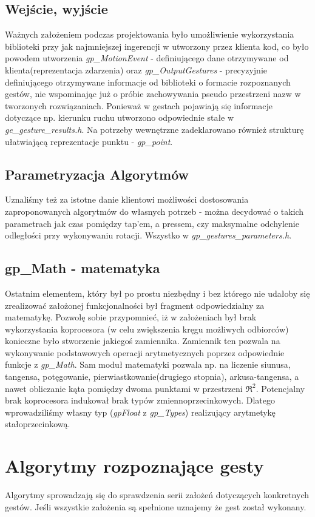 \documentclass[a4paper,12pt]{article}
\begin{document}
\subsection{Wejście, wyjście} Ważnych założeniem podczas projektowania było umożliwienie wykorzystania biblioteki przy jak najmniejszej ingerencji w utworzony przez klienta kod, co było powodem utworzenia \textit{gp_MotionEvent} - definiującego dane otrzymywane od klienta(reprezentacja zdarzenia) oraz \textit{gp_OutputGestures} - precyzyjnie definiującego otrzymywane informacje od biblioteki o formacie rozpoznanych gestów, nie wspominając już o próbie zachowywania pseudo przestrzeni nazw w tworzonych rozwiązaniach. Ponieważ w gestach pojawiają się informacje dotyczące np. kierunku ruchu utworzono odpowiednie stałe w \textit{ge_gesture_results.h}. Na potrzeby wewnętrzne zadeklarowano również strukturę ułatwiającą reprezentacje punktu - \textit{gp_point}. 

\subsection{Parametryzacja Algorytmów} Uznaliśmy też za istotne danie klientowi możliwości dostosowania zaproponowanych algorytmów do własnych potrzeb - można decydować o takich parametrach jak czas pomiędzy tap'em, a pressem, czy maksymalne odchylenie odległości przy wykonywaniu rotacji. Wszystko w \textit{gp_gestures_parameters.h}. 

\subsection{gp_Math - matematyka}Ostatnim elementem, który był po prostu niezbędny i bez którego nie udałoby się zrealizować założonej funkcjonalności był fragment odpowiedzialny za matematykę. Pozwolę sobie przypomnieć, iż w założeniach był brak wykorzystania koprocesora (w celu zwiększenia kręgu możliwych odbiorców) konieczne było stworzenie jakiegoś zamiennika. Zamiennik ten pozwala na wykonywanie podstawowych operacji arytmetycznych poprzez odpowiednie funkcje z \textit{gp_Math}. Sam moduł matematyki pozwala np. na liczenie siunusa, tangensa, potęgowanie, pierwiastkowanie(drugiego stopnia), arkusa-tangensa, a nawet obliczanie kąta pomiędzy dwoma punktami w przestrzeni $\Re^2$. Potencjalny brak koprocesora indukował brak typów zmiennoprzecinkowych. Dlatego wprowadziliśmy własny typ (\textit{gpFloat} z \textit{gp_Types}) realizujący arytmetykę stałoprzecinkową.

\section{Algorytmy rozpoznające gesty}
	Algorytmy sprowadzają się do sprawdzenia serii założeń dotyczących konkretnych gestów. Jeśli wszystkie założenia są spełnione uznajemy że gest został wykonany.
	
\end{document}
